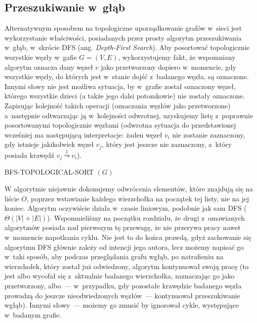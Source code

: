 \subsection{Przeszukiwanie w~głąb}

Alternatywnym sposobem na topologiczne uporządkowanie grafów w~sieci jest wykorzystanie właściwości, posiadanych przez prosty algorytm przeszukiwania w~głąb, w~skrócie \textsf{DFS} (ang. \textit{Depth-First Search}). Aby posortować topologicznie wszystkie węzły w~gafie $G = \left( V, E \right)$, wykorzystujemy fakt, że wspomniany algorytm oznacza dany węzeł $v$ jako przetworzony dopiero w~momencie, gdy wszystkie węzły, do których jest w~stanie dojść z~badanego węzła, są oznaczone. Innymi słowy nie jest możliwa sytuacja, by w~grafie został oznaczony węzeł, którego wszystkie dzieci (a także jego dalsi potomkowie) nie zostały oznaczone. Zapisując kolejność takich operacji (oznaczania węzłów jako przetworzone) a~następnie odtwarzając ją w~kolejności odwrotnej, uzyskujemy listę z~poprawnie posortowanymi topologicznie węzłami (odwrotna sytuacja do przedstawionej wcześniej ma następującą interpretacje: żaden węzeł $v_{i}$ nie zostanie zaznaczony, gdy istnieje jakikolwiek węzeł $v_{j}$, który jest jeszcze nie zaznaczony, a~który posiada krawędź $v_{j} \overset{1} \leadsto v_{i}$).

\begin{pseudokod}[!htbp]
\DontPrintSemicolon
{}
\caption{ BFS-TOPOLOGICAL-SORT $\left( G \right)$\label{alg:BFSTopologicalSort}}
\end{pseudokod}

W algorytmie niejawnie dokonujemy odwrócenia elementów, które znajdują się na liście $O$, poprzez wstawianie każdego wierzchołka na początek tej listy, nie na jej koniec. Algorytm oczywiście działa w~czasie liniowym, podobnie jak sam \textsf{DFS} ($ \Theta \left( \left| V \right| + \left| E \right| \right)$). Wspomnieliśmy na początku rozdziału, że drugi z~omawianych algorytmów posiada nad pierwszym tę przewagę, że nie przerywa pracy nawet w~momencie napotkania cyklu. Nie jest to do końca prawdą, gdyż zachowanie się algorytmu \textsf{DFS} głównie zależy od intencji jego autora, lecz możemy napisać go w~taki sposób, aby podczas przeglądania grafu wgłąb, po natrafieniu na wierzchołek, który został już odwiedzony, algorytm kontynuował swoją pracę (to jest albo wycofał się z~aktualnie badanego wierzchołka, zaznaczając go jako przetworzony, albo~--- w~przypadku, gdy pozostałe krawędzie badanego węzła prowadzą do jeszcze nieodwiedzonych węzłów~--- kontynuował przeszukiwanie wgłąb). Innymi słowy~--- możemy go zmusić by ignorował cykle, występujące w~badanym grafie.

